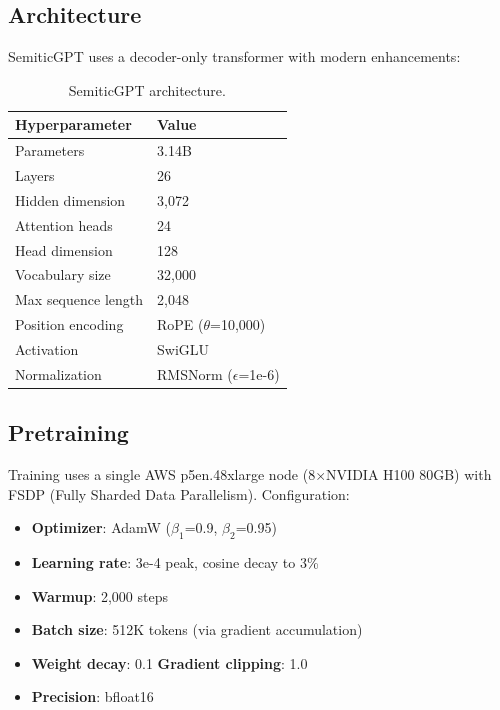 \documentclass[10pt,twocolumn]{article}
\begin{document}
\subsection{Architecture}

SemiticGPT uses a decoder-only transformer with modern enhancements:

\begin{table}[H]
\centering\small
\begin{tabular}{ll}
\toprule
\textbf{Hyperparameter} & \textbf{Value} \\
\midrule
Parameters & 3.14B \\
Layers & 26 \\
Hidden dimension & 3,072 \\
Attention heads & 24 \\
Head dimension & 128 \\
Vocabulary size & 32,000 \\
Max sequence length & 2,048 \\
Position encoding & RoPE ($\theta$=10,000) \\
Activation & SwiGLU \\
Normalization & RMSNorm ($\epsilon$=1e-6) \\
\bottomrule
\end{tabular}
\caption{SemiticGPT architecture.}
\label{tab:architecture}
\end{table}

\subsection{Pretraining}

Training uses a single AWS p5en.48xlarge node (8$\times$NVIDIA H100 80GB) with FSDP (Fully Sharded Data Parallelism). Configuration:

\begin{itemize}
    \item \textbf{Optimizer}: AdamW ($\beta_1$=0.9, $\beta_2$=0.95)
    \item \textbf{Learning rate}: 3e-4 peak, cosine decay to 3\%
    \item \textbf{Warmup}: 2,000 steps
    \item \textbf{Batch size}: 512K tokens (via gradient accumulation)
    \item \textbf{Weight decay}: 0.1 \quad \textbf{Gradient clipping}: 1.0
    \item \textbf{Precision}: bfloat16
\end{itemize}
\end{document}
